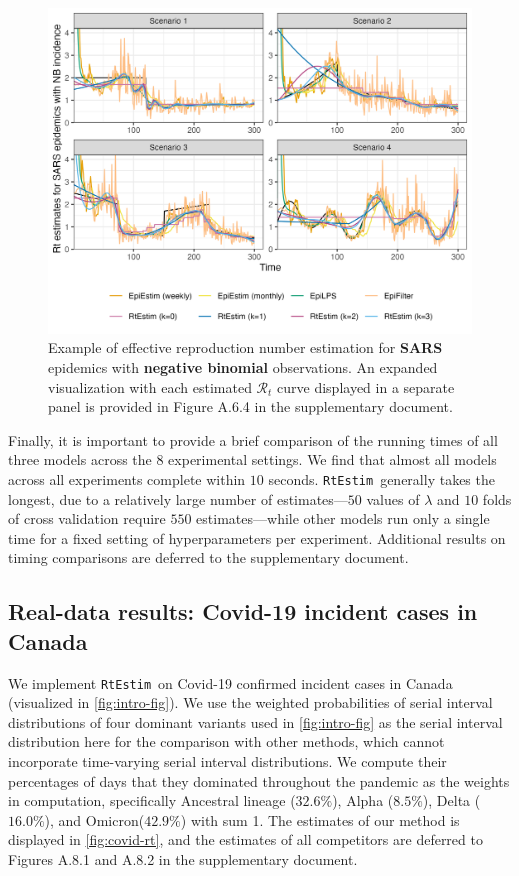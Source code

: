 \documentclass[10pt,letterpaper]{article}
\def\RtEstim{\texttt{RtEstim}}
\def\calR{\mathcal{R}}
\begin{document}
\begin{figure}[!ht]
  \centering
  \includegraphics*[width=.99\textwidth]{fig/fig_res_NB_sars.png}
  \caption{Example of effective reproduction number estimation for \textbf{SARS} 
  epidemics with \textbf{negative binomial} observations. An expanded visualization 
  with each estimated $\calR_t$ curve displayed in a separate panel is provided 
  in Figure A.6.4 in the supplementary document.}
  \label{fig:nb-est-measles}
\end{figure}

Finally, it is important to provide a brief comparison of the running times of
all three models across the $8$ experimental settings. We find that almost all
models across all experiments complete within $10$ seconds. \RtEstim\ generally
takes the longest, due to a relatively large number of estimates---$50$ values
of $\lambda$ and $10$ folds of cross validation require $550$ estimates---while
other models run only a single time for a fixed setting of hyperparameters per
experiment. Additional results on timing comparisons are deferred to the
supplementary document. 


\subsection{Real-data results: Covid-19 incident cases in Canada}

We implement \RtEstim\ on Covid-19 confirmed incident cases in Canada (visualized in 
\autoref{fig:intro-fig}). 
We use the weighted probabilities of serial interval distributions of four dominant
variants used in \autoref{fig:intro-fig} as the serial interval distribution here for the
comparison with other methods, which cannot incorporate time-varying serial interval distributions. 
We compute their percentages of days that they dominated throughout the pandemic as the weights in computation, 
specifically Ancestral lineage ($32.6\%$), Alpha ($8.5\%$), Delta ($16.0\%$), and Omicron($42.9\%$) with sum 1. 
The estimates of our method is displayed in \autoref{fig:covid-rt}, and the estimates of 
all competitors are deferred to Figures A.8.1 and A.8.2 in the supplementary document. 
\end{document}
